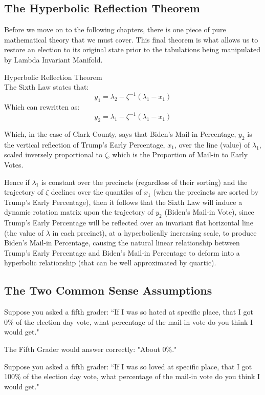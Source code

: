 \subsection{The Hyperbolic Reflection Theorem}
Before we move on to the following chapters, there is one piece of pure mathematical theory that we must cover. This final theorem is what allows us to restore an election to its original state prior to the tabulations being manipulated by Lambda Invariant Manifold.
\begin{theorem}{Hyperbolic Reflection Theorem}\\
The Sixth Law states that:
$$y_{1}=\lambda_{2}-\zeta^{-1}(\lambda_{1}-x_{1})$$
Which can rewritten as:
$$y_{2}=\lambda_{1}-\zeta^{-1} (\lambda_{1}-x_{1})$$

Which, in the case of Clark County, says that Biden's Mail-in Percentage, $y_{2}$ is the vertical reflection of Trump's Early Percentage, $x_{1}$, over the line (value) of $\lambda_{1}$, scaled inversely proportional to $\zeta$, which is the Proportion of Mail-in to Early Votes.

Hence if $\lambda_{1}$ is constant over the precincts (regardless of their sorting) and the trajectory of $\zeta$ declines over the quantiles of $x_{1}$ (when the precincts are sorted by Trump's Early Percentage), then it follows that the Sixth Law will induce a dynamic rotation matrix upon the trajectory of $y_{2}$ (Biden's Mail-in Vote), since Trump's Early Percentage will be reflected over an invariant flat horizontal line (the value of $\lambda$ in each precinct), at a hyperbolically increasing scale, to produce Biden's Mail-in Percentage, causing the natural linear relationship between Trump's Early Percentage and Biden's Mail-in Percentage to deform into a hyperbolic relationship (that can be well approximated by quartic).
\end{theorem}
\newpage
\subsection{The Two Common Sense Assumptions}

Suppose you asked a fifth grader: ``If I was so hated at specific place, that I got 0\% of the election day vote, what percentage of the mail-in vote do you think I would get."

The Fifth Grader would answer correctly: "About 0\%."

Suppose you asked a fifth grader: ``If I was so loved at specific place, that I got 100\% of the election day vote, what percentage of the mail-in vote do you think I would get."

